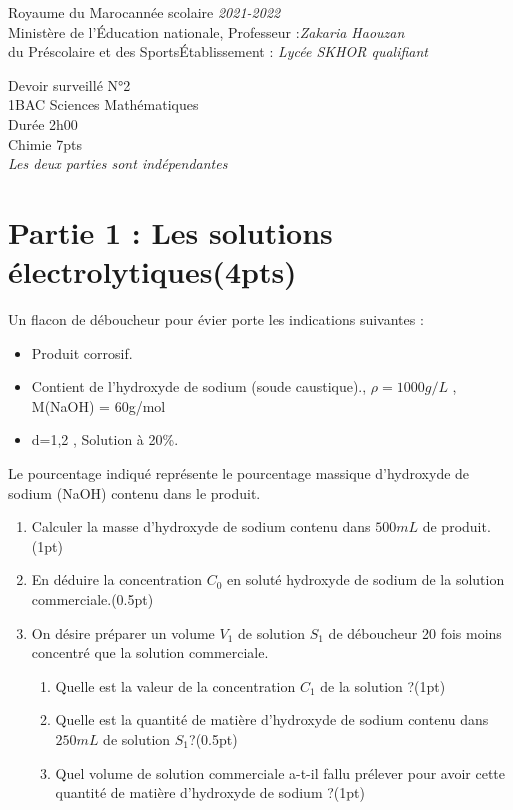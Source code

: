 \documentclass[12pt]{article}
\newcommand\headerMe[2]{\noindent{}#1\hfill#2}
\begin{document}
\headerMe{Royaume du Maroc}{année scolaire \emph{2021-2022}}\\
\headerMe{Ministère de l'Éducation nationale, }{  Professeur :\emph{Zakaria Haouzan}}\\
\headerMe{du Préscolaire et des Sports}{Établissement : \emph{Lycée SKHOR qualifiant}}\\

\begin{center}
Devoir surveillé N°2 \\
    1BAC Sciences Mathématiques\\
Durée 2h00
\\
    \vspace{.2cm}
\hrulefill
\Large{Chimie 7pts}
\hrulefill\\

    \emph{Les deux parties sont indépendantes}
\end{center}

\section*{Partie 1 : Les solutions électrolytiques\dotfill(4pts) }
Un flacon de déboucheur pour évier porte les indications suivantes :
   \begin{itemize}
      \item Produit corrosif.
      \item Contient de l’hydroxyde de sodium (soude caustique)., $\rho = 1000g/L$ , M(NaOH) = 60g/mol
      \item d=1,2 ,  Solution à 20\%.
   \end{itemize}
Le pourcentage indiqué représente le pourcentage massique d’hydroxyde de sodium (NaOH) contenu dans
le produit.
\begin{enumerate}
    \item Calculer la masse d’hydroxyde de sodium contenu dans $500 mL$ de produit.\dotfill(1pt)
    \item En déduire la concentration $C_0$ en soluté hydroxyde de sodium de la solution commerciale.\dotfill(0.5pt)
    \item On désire préparer un volume $V_1$ de solution $S_1$ de déboucheur 20 fois moins concentré que la solution commerciale.

        \begin{enumerate}
            \item Quelle est la valeur de la concentration $C_1$ de la solution ?\dotfill(1pt)
            \item Quelle est la quantité de matière d’hydroxyde de sodium contenu dans $250 mL$ de solution $S_1$?\dotfill(0.5pt)
            \item Quel volume de solution commerciale a-t-il fallu prélever pour avoir cette quantité de matière d’hydroxyde de sodium ?\dotfill(1pt)
        \end{enumerate}
\end{enumerate}
\end{document}
